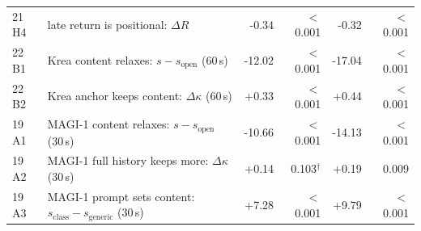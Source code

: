 \begin{table}[h]
\begin{tabular}{@{}llrrrr@{}}
21 H4 & late return is positional: $\Delta R$ & -0.34 & $<$0.001 & -0.32 & $<$0.001 \\
22 B1 & Krea content relaxes: $s - s_{\text{open}}$ (60\,s) & -12.02 & $<$0.001 & -17.04 & $<$0.001 \\
22 B2 & Krea anchor keeps content: $\Delta\kappa$ (60\,s) & +0.33 & $<$0.001 & +0.44 & $<$0.001 \\
19 A1 & MAGI-1 content relaxes: $s - s_{\text{open}}$ (30\,s) & -10.66 & $<$0.001 & -14.13 & $<$0.001 \\
19 A2 & MAGI-1 full history keeps more: $\Delta\kappa$ (30\,s) & +0.14 & 0.103$^\dagger$ & +0.19 & 0.009 \\
19 A3 & MAGI-1 prompt sets content: $s_{\text{class}} - s_{\text{generic}}$ (30\,s) & +7.28 & $<$0.001 & +9.79 & $<$0.001 \\
\bottomrule
\end{tabular}
\end{table}
